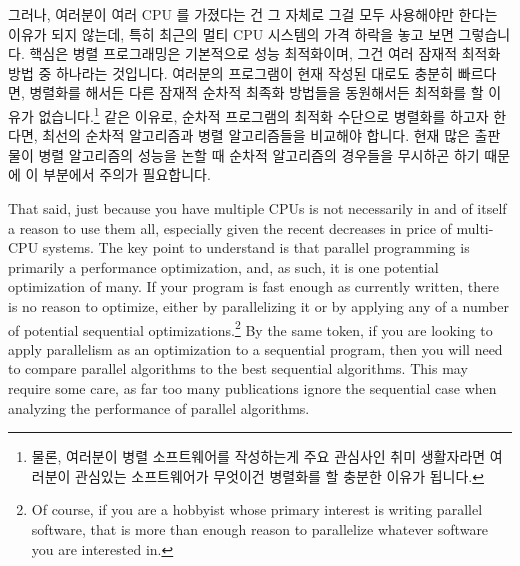그러나, 여러분이 여러 CPU 를 가졌다는 건 그 자체로 그걸 모두 사용해야만 한다는
이유가 되지 않는데, 특히 최근의 멀티 CPU 시스템의 가격 하락을 놓고 보면
그렇습니다.
핵심은 병렬 프로그래밍은 기본적으로 성능 최적화이며, 그건 여러 잠재적 최적화
방법 중 하나라는 것입니다.
여러분의 프로그램이 현재 작성된 대로도 충분히 빠르다면, 병렬화를 해서든 다른
잠재적 순차적 최족화 방법들을 동원해서든 최적화를 할 이유가 없습니다.\footnote{
	물론, 여러분이 병렬 소프트웨어를 작성하는게 주요 관심사인 취미
	생활자라면 여러분이 관심있는 소프트웨어가 무엇이건 병렬화를 할 충분한
	이유가 됩니다.}
같은 이유로, 순차적 프로그램의 최적화 수단으로 병렬화를 하고자 한다면, 최선의
순차적 알고리즘과 병렬 알고리즘들을 비교해야 합니다.
현재 많은 출판물이 병렬 알고리즘의 성능을 논할 때 순차적 알고리즘의 경우들을
무시하곤 하기 때문에 이 부분에서 주의가 필요합니다.

\iffalse

That said, just because you have multiple CPUs is not necessarily
in and of itself a reason to use them all, especially given the
recent decreases in price of multi-CPU systems.
The key point to understand is that parallel programming is primarily
a performance optimization, and, as such, it is one potential optimization
of many.
If your program is fast enough as currently written, there is no
reason to optimize, either by parallelizing it or by applying any
of a number of potential sequential optimizations.\footnote{
	Of course, if you are a hobbyist whose primary interest is
	writing parallel software, that is more than enough reason to
	parallelize whatever software you are interested in.}
By the same token, if you are looking to apply parallelism as an
optimization to a sequential program, then you will need to compare
parallel algorithms to the best sequential algorithms.
This may require some care, as far too many publications ignore the
sequential case when analyzing the performance of parallel algorithms.

